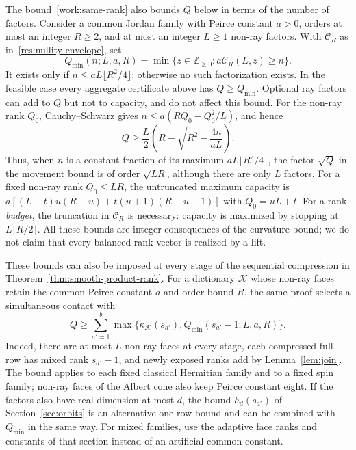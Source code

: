 The bound~\eqref{work:same-rank} also bounds $Q$ below in terms of the
number of factors. Consider a common Jordan family
with Peirce constant $a>0$, orders at most an integer $R\geq2$, and at
most an integer $L\geq1$ non-ray factors. With $\mathcal C_R$ as in~\eqref{res:nullity-envelope},
set
\begin{equation}\label{work:qmin}
 Q_{\min}(n;L,a,R)=\min\{z\in\mathbb Z_{\geq0}:
                              a\mathcal C_R(L,z)\geq n\}.
\end{equation}
It exists only if $n\leq aL\lfloor R^2/4\rfloor$; otherwise
no such factorization exists. In the feasible case every aggregate certificate
above has $Q\geq Q_{\min}$. Optional ray factors can add to $Q$ but not
to capacity, and do not affect this bound. For the non-ray rank
$Q_0$, Cauchy--Schwarz gives
$n\leq a(RQ_0-Q_0^2/L)$, and hence
\begin{equation}\label{work:continuous-rank}
 Q\geq\frac L2\left(R-\sqrt{R^2-\frac{4n}{aL}}\right).
\end{equation}
Thus, when $n$ is a constant fraction of its maximum $aL\lfloor R^2/4\rfloor$, the factor
$\sqrt Q$ in the movement bound is of order $\sqrt{LR}$, although there
are only $L$ factors. For a fixed non-ray rank $Q_0\leq LR$, the
untruncated maximum capacity is $a[(L-t)u(R-u)+t(u+1)(R-u-1)]$ with $Q_0=uL+t$.
For a rank \emph{budget}, the truncation in $\mathcal C_R$ is necessary:
capacity is maximized by stopping at $L\lfloor R/2\rfloor$.
All these bounds are integer consequences of the curvature bound; we do
not claim that every balanced rank vector is realized by a lift.

These bounds can also be imposed at every stage of the sequential
compression in Theorem~\ref{thm:smooth-product-rank}. For a dictionary
$\mathscr K$ whose non-ray faces retain the common Peirce constant $a$
and order bound $R$, the same proof selects a simultaneous contact with
\begin{equation}\label{work:sequential-budget}
 Q\geq\sum_{a'=1}^b
 \max\{\kappa_{\mathscr K}(s_{a'}),
           Q_{\min}(s_{a'}-1;L,a,R)\}.
\end{equation}
Indeed, there are at most $L$ non-ray faces at every stage, each
compressed full row has mixed rank $s_{a'}-1$, and newly exposed ranks
add by Lemma~\ref{lem:join}. The bound applies to each fixed classical
Hermitian family and to a fixed spin family; non-ray faces of the Albert
cone also keep Peirce constant eight. If the factors also have real
dimension at most $d$, the bound $h_d(s_{a'})$ of
Section~\ref{sec:orbits} is an alternative one-row bound and can be
combined with $Q_{\min}$ in the same way. For mixed families, use the
adaptive face ranks and constants of that section instead of an
artificial common constant.

